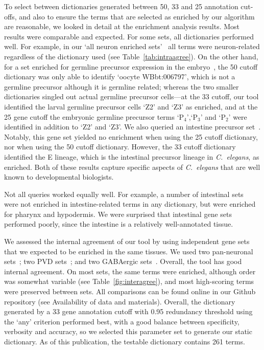 To select between dictionaries generated between 50, 33 and 25 annotation
cut-offs, and also to ensure the terms that are selected as enriched by our
algorithm are reasonable, we looked in detail at the enrichment analysis results.
Most results were comparable and expected. For some sets, all dictionaries
performed well. For example, in our `all neuron enriched sets'~\citep{Spencer2011,
Watson2008a} all terms were neuron-related regardless of the dictionary used
(see Table~\ref{tab:intraagree}). On the other hand, for a set enriched for
germline precursor expression in the embryo~\citep{Spencer2011}, the 50 cutoff
dictionary was only able to identify `oocyte WBbt:006797', which is not a
germline precursor although it is germline related; whereas the two smaller
dictionaries singled out actual germline precursor cells---at the 33 cutoff, our
tool identified the larval germline precursor cells `Z2' and `Z3' as enriched,
and at the 25 gene cutoff the embryonic germline precursor terms `P$_4$',`P$_3$'
and `P$_2$' were identified in addition to `Z2' and `Z3'.
We also queried an intestine precursor set~\citep{Spencer2011}. Notably, this
gene set yielded no enrichment when using the 25 cutoff dictionary, nor when
using the 50 cutoff dictionary. However, the 33 cutoff dictionary identified the
E lineage, which is the intestinal precursor lineage in \emph{C.~elegans}, as
enriched. Both of these results capture specific aspects of \emph{C.~elegans}
that are well known to developmental biologists.

Not all queries worked equally well. For example, a number of intestinal
sets~\citep{Spencer2011, Pauli2006} were not enriched in intestine-related terms
in any dictionary, but were enriched for pharynx and hypodermis. We were
surprised that intestinal gene sets performed poorly, since the intestine is a
relatively well-annotated tissue.

We assessed the internal agreement of our tool by using independent gene sets
that we expected to be enriched in the same tissues. We used two  pan-neuronal
sets~\citep{Spencer2011, Watson2008a}; two PVD sets~\citep{Spencer2011, Smith2010};
and two  GABAergic sets~\citep{Spencer2011, Cinar2005}. Overall, the tool has
good internal agreement. On most sets, the same terms were enriched, although
order was somewhat variable (see Table~\ref{fig:interagree}), and most
high-scoring terms were preserved between sets. All comparisons can be found
online in our Github repository (see Availability of data and materials).
Overall, the dictionary generated by a 33 gene annotation cutoff with 0.95
redundancy threshold using the `any' criterion performed best, with a good
balance between specificity, verbosity and accuracy, so we selected this
parameter set to generate our static dictionary. As of this publication, the
testable dictionary contains 261 terms.


